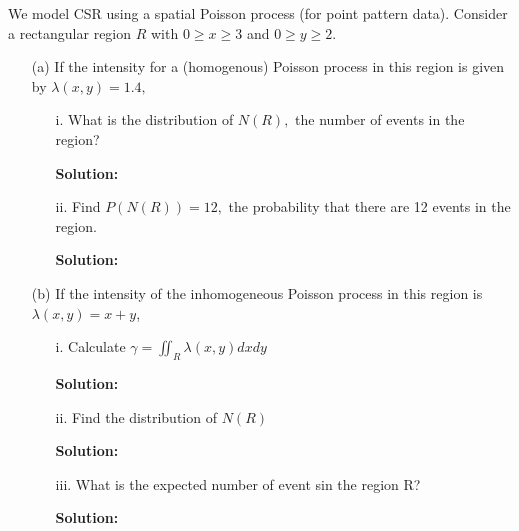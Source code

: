\documentclass[12pt]{article}
\makeatletter
\theoremstyle{homework}
\newenvironment{exercise}[1]
{\def\@currentlabel{#1}\exercisecore}
{\endexercisecore}
\newcommand{\localhead}[1]{\par\smallskip\noindent\textbf{#1}\nobreak\\}%
\newcommand\solution{\localhead{Solution:}}
\makeatother
\begin{document}
\begin{exercise}{2} We model CSR using a spatial Poisson process (for point pattern data). Consider a rectangular region $R$
  with $0 \geq x \geq 3$ and $0 \geq y \geq 2$.\\
  \begin{enumerate}
    \item[(a)] If the intensity for a (homogenous) Poisson process in this region is given by $\lambda(x, y) = 1.4,$\\
    \begin{enumerate}
      \item[i.] What is the distribution of $N(R),$ the number of events in the region?\\
      \solution
      \vspace{.15in}
      \item[ii.] Find $P(N(R)) = 12,$ the probability that there are 12 events in the region.\\
      \solution
      \vspace{.15in}
    \end{enumerate} 

    \item[(b)] If the intensity of the inhomogeneous Poisson process in this region is $\lambda(x, y) = x + y$, \\
    \begin{enumerate}
      \item[i.] Calculate $\gamma = \iint_R \lambda(x, y) dx dy$\\
      \solution
      \vspace{.15in}
      \item[ii.] Find the distribution of $N(R)$\\
      \solution
      \vspace{.15in}
     \item[iii.] What is the expected number of event sin the region R?\\
     \solution
     \vspace{.15in}
    \end{enumerate} 
  \end{enumerate}
  
\end{exercise}
\end{document}
